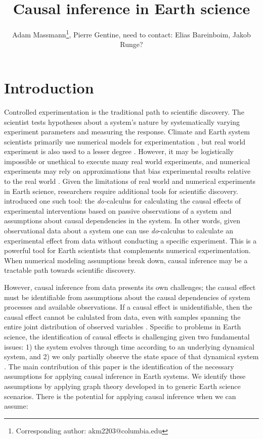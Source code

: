 \documentclass[12pt]{article}
\begin{document}
\title{Causal inference in Earth science}

\author{Adam Massmann\thanks{Corresponding author:
    akm2203@columbia.edu}, Pierre Gentine, need to contact: Elias
  Bareinboim, Jakob Runge?}

\maketitle

\section{Introduction}

Controlled experimentation is the traditional path to scientific
discovery. The scientist tests hypotheses about a system's nature by
systematically varying experiment parameters and measuring the
response. Climate and Earth system scientists primarily use numerical
models for experimentation \citep[e.g.,][]{eyring-cmip6-2016}, but
real world experiment is also used to a lesser degree
\citep[e.g.,][]{ainsworth-face-2005}. However, it may be logistically
impossible or unethical to execute many real world experiments, and
numerical experiments may rely on approximations that bias
experimental results relative to the real world
\citep[e.g.,][]{kim-cmip5,stillmann-cmip5-extremes}. Given the
limitations of real world and numerical experiments in Earth science,
researchers require additional tools for scientific discovery.
\citet{pearl-1994-do-calculus} introduced one such tool: the
\textit{do-}calculus for calculating the causal effects of
experimental interventions based on passive observations of a system
and assumptions about causal dependencies in the system. In other
words, given observational data about a system one can use
\textit{do}-calculus to calculate an experimental effect from data
without conducting a specific experiment. This is a powerful tool for
Earth scientists that complements numerical experimentation. When
numerical modeling assumptions break down, causal inference may be a
tractable path towards scientific discovery.

However, causal inference from data presents its own challenges; the
causal effect must be identifiable from assumptions about the causal
dependencies of system processes and available observations. If a
causal effect is unidentifiable, then the causal effect cannot be
calulated from data, even with samples spanning the entire joint
distribution of observed variables \citep[][]{shpitser2006}. Specific
to problems in Earth science, the identification of causal effects is
challenging given two fundamental issues: 1) the system evolves
through time according to an underlying dynamical system, and 2) we
only partially observe the state space of that dynamical system
\citep{majda-state}. The main contribution of this paper is the
identification of the necessary assumptions for applying causal
inference in Earth systems. We identify these assumptions by applying
graph theory developed in \citet{pearl1995causal} to generic Earth
science scenarios. There is the potential for applying causal
inference when we can assume:
\end{document}
